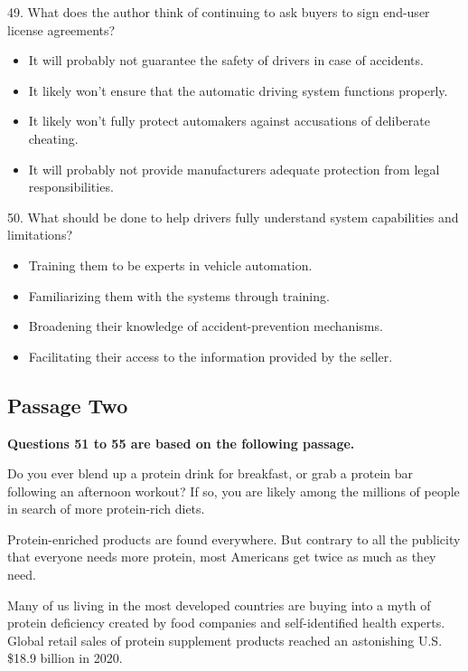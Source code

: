 \documentclass[UTF8,11pt]{ctexart}
\begin{document}
49. What does the author think of continuing to ask buyers to sign end-user license agreements?


\begin{itemize}[leftmargin=2em,itemsep=.2em,topsep=.4em]\item[A.] It will probably not guarantee the safety of drivers in case of accidents.
\item[B.] It likely won’t ensure that the automatic driving system functions properly.
\item[C.] It likely won’t fully protect automakers against accusations of deliberate cheating.
\item[D.] It will probably not provide manufacturers adequate protection from legal responsibilities.
\end{itemize}

50. What should be done to help drivers fully understand system capabilities and limitations?


\begin{itemize}[leftmargin=2em,itemsep=.2em,topsep=.4em]\item[A.] Training them to be experts in vehicle automation.
\item[B.] Familiarizing them with the systems through training.
\item[C.] Broadening their knowledge of accident-prevention mechanisms.
\item[D.] Facilitating their access to the information provided by the seller.
\end{itemize}

\subsection*{\textbf{Passage Two}}


\textbf{Questions 51 to 55 are based on the following passage.}


Do you ever blend up a protein drink for breakfast, or grab a protein bar following an afternoon workout? If so, you are likely among the millions of people in search of more protein-rich diets.


Protein-enriched products are found everywhere. But contrary to all the publicity that everyone needs more protein, most Americans get twice as much as they need.


Many of us living in the most developed countries are buying into a myth of protein deficiency created by food companies and self-identified health experts. Global retail sales of protein supplement products reached an astonishing U.S. \$18.9 billion in 2020.
\end{document}
